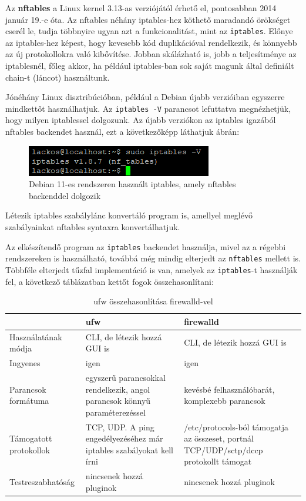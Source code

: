 Az \textbf{nftables} a Linux kernel 3.13-as verziójától érhető el, pontosabban 2014 január 19.-e óta. Az nftables néhány iptables-hez köthető maradandó örökséget cserél le, tudja többnyire ugyan azt a funkcionalitást, mint az \texttt{iptables}. Előnye az iptables-hez képest, hogy kevesebb kód duplikációval rendelkezik, és könnyebb az új protokollokra való kibővítése. \cite{nftables}
Jobban skálázható is, jobb a teljesítménye az iptablesnél, főleg akkor, ha például iptables-ban sok saját magunk által definiált chain-t (láncot) használtunk.

Jónéhány Linux disztribúcióban, például a Debian újabb verzióiban egyszerre mindkettőt használhatjuk. Az \texttt{iptables -V} parancsot lefuttatva megnézhetjük, hogy milyen iptablessel dolgozunk. Az újabb verziókon az iptables igazából nftables backendet használ, ezt a következőképp láthatjuk  ábrán:
\begin{figure}[h]
\centering
\includegraphics[scale=1.0]{images/iptables_nftables.png}
\caption{Debian 11-es rendszeren használt iptables, amely nftables backenddel dolgozik}
\label{fig:iptables_nftables}
\end{figure}

Létezik iptables szabálylánc konvertáló program is, amellyel meglévő szabályainkat nftables syntaxra konvertálhatjuk. 

Az elkészítendő program az \texttt{iptables} backendet használja, mivel az a régebbi rendszereken is használható, továbbá még mindig elterjedt az \texttt{nftables} mellett is. Többféle elterjedt tűzfal implementáció is van, amelyek az \texttt{iptables}-t használják fel, a következő  táblázatban kettőt fogok összehasonlítani:

\begin{table}[h]
\centering
\caption{ufw összehasonlítása firewalld-vel}
\label{tab:ufw_vs_firewalld}
\begin{tabularx}{\linewidth}{l|L|L}
 & ufw & firewalld \\
\hline
Használatának módja & CLI, de létezik hozzá GUI is & CLI, de létezik hozzá GUI is \\
\hline
Ingyenes & igen & igen \\
\hline
Parancsok formátuma & egyszerű parancsokkal rendelkezik, angol parancsok könnyű paraméterezéssel \cite{ufw} & kevésbé felhasználóbarát, komplexebb parancsok \cite{firewalld_man}\\
\hline
Támogatott protokollok & TCP, UDP. A ping engedélyezéséhez már iptables szabályokat kell írni & /etc/protocols-ból támogatja az összeset, portnál TCP/UDP/sctp/dccp protokollt támogat \\
\hline
Testreszabhatóság & nincsenek hozzá pluginok & nincsenek hozzá pluginok \\
\end{tabularx}
\end{table}

